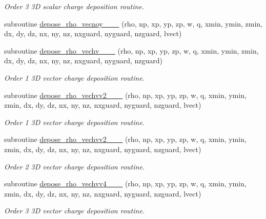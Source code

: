 \begin{DoxyCompactItemize}
\begin{DoxyCompactList}\small\item\em Order 3 3D scalar charge deposition routine. \end{DoxyCompactList}\item 
subroutine \hyperlink{charge__deposition_8_f90_a570a05e74c2ed2a6fb9f9bf851e68390}{depose\+\_\+rho\+\_\+vecnoy\+\_\+\_\+\_} (rho, np, xp, yp, zp, w, q, xmin, ymin, zmin, dx, dy, dz, nx, ny, nz, nxguard, nyguard, nzguard, lvect)
\item 
subroutine \hyperlink{charge__deposition_8_f90_adc97e08f9c05367856b1cac3aedaf91b}{depose\+\_\+rho\+\_\+vechv\+\_\+\_\+\_} (rho, np, xp, yp, zp, w, q,                               xmin, ymin, zmin, dx, dy, dz, nx, ny, nz, nxguard, nyguard, nzguard)
\begin{DoxyCompactList}\small\item\em Order 1 3D vector charge deposition routine. \end{DoxyCompactList}\item 
subroutine \hyperlink{charge__deposition_8_f90_a66c87ccc669ef28ae7e636d8b39e050a}{depose\+\_\+rho\+\_\+vechvv2\+\_\+\_\+\_} (rho, np, xp, yp, zp, w, q, xmin, ymin, zmin, dx, dy, dz, nx, ny, nz,                                   nxguard, nyguard, nzguard, lvect)
\begin{DoxyCompactList}\small\item\em Order 1 3D vector charge deposition routine. \end{DoxyCompactList}\item 
subroutine \hyperlink{charge__deposition_8_f90_a618d3787267c54578f40d084c4d915e3}{depose\+\_\+rho\+\_\+vechvv2\+\_\+\_\+\_} (rho, np, xp, yp, zp, w, q, xmin, ymin, zmin, dx, dy, dz, nx, ny, nz, nxguard, nyguard, nzguard, lvect)
\begin{DoxyCompactList}\small\item\em Order 2 3D vector charge deposition routine. \end{DoxyCompactList}\item 
subroutine \hyperlink{charge__deposition_8_f90_a55f64905a5f5c387baef1cdddfc060f7}{depose\+\_\+rho\+\_\+vechvv4\+\_\+\_\+\_} (rho, np, xp, yp, zp, w, q, xmin, ymin, zmin, dx, dy, dz, nx, ny, nz, nxguard, nyguard, nzguard, lvect)
\begin{DoxyCompactList}\small\item\em Order 3 3D vector charge deposition routine. \end{DoxyCompactList}\item 

\end{DoxyCompactItemize}
